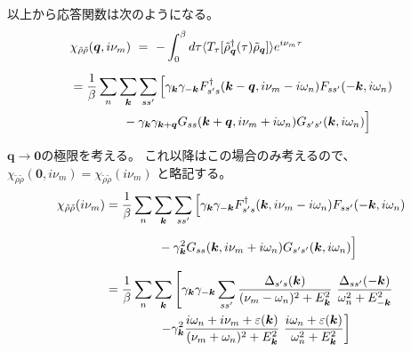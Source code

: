 \documentclass[a4j]{jsarticle}
\begin{document}
以上から応答関数は次のようになる。
\begin{align}
	 &
	\chi_{\tilde{\rho} \tilde{\rho}}(\bm{q},i \nu_{m})
	\ = \
	-
	\int^{\beta}_{0} d \tau
	\langle T_{\tau}[ \tilde{\rho}_{\bm{q}}^{\dagger} (\tau) \tilde{\rho}_{\bm{q}} ] \rangle
	e^{i \nu_{m} \tau}
	\nonumber \\[2mm]
	 & =
	\dfrac{1}{\beta}
	\sum_{n}
	\sum_{ \bm{k} }
	\sum_{s s'}
	\Big[
		\gamma_{\bm{k}}
		\gamma_{-\bm{k}}
		F_{ s' s }^{\dagger}( \bm{k} - \bm{q} , i \nu_{m} - i \omega_{n} )
		F_{ s s' } ( - \bm{k} , i \omega_{n} )
	\nonumber \\ & \hspace{15mm} -
		\gamma_{\bm{k}}
		\gamma_{\bm{k}+\bm{q}}
		G_{ s s } ( \bm{k} + \bm{q} , i \nu_{m} + i \omega_{n} )
		G_{ s' s' } ( \bm{k} , i \omega_{n} )
		\Big]
\end{align}

$\bm{q} \to \bm{0}$の極限を考える。
これ以降はこの場合のみ考えるので、
$\chi_{\tilde{\rho} \tilde{\rho}}(\bm{0},i \nu_{m}) = \chi_{\tilde{\rho} \tilde{\rho}}(i \nu_{m})$
と略記する。
\begin{align}
	\chi_{\tilde{\rho} \tilde{\rho}}(i \nu_{m})
	 & =
	\dfrac{1}{\beta}
	\sum_{n}
	\sum_{ \bm{k} }
	\sum_{s s'}
	\Big[
		\gamma_{\bm{k}}
		\gamma_{-\bm{k}}
		F_{ s' s }^{\dagger}( \bm{k} , i \nu_{m} - i \omega_{n} )
		F_{ s s' } ( - \bm{k} , i \omega_{n} )
	\nonumber \\[2mm] & \hspace{15mm} -
	\gamma_{\bm{k}}^{2}
	G_{ s s } ( \bm{k} , i \nu_{m} + i \omega_{n} )
	G_{ s' s' } ( \bm{k} , i \omega_{n} )
	\Big]
	\nonumber \\[2mm]
	 & =
	\dfrac{1}{\beta}
	\sum_{n}
	\sum_{ \bm{k} }
	\left[
		\gamma_{\bm{k}}
		\gamma_{-\bm{k}}
		\sum_{s s'}
		\dfrac{ \Delta_{s' s}(\bm{k}) }{ ( \nu_{m} - \omega_{n} )^{2} + E_{\bm{k}}^{2} }
		\
		\dfrac{ \Delta_{s s'}(-\bm{k}) }{ \omega_{n}^{2} + E_{-\bm{k}}^{2} }
		\right.
	\nonumber \\ & \hspace{15mm} \left.
		-
		\gamma_{\bm{k}}^{2}
		\dfrac{ i \omega_{n} + i \nu_{m} + \varepsilon(\bm{k}) }{ ( \nu_{m} + \omega_{n} )^{2} + E_{\bm{k}}^{2} }
		\
		\dfrac{ i \omega_{n} + \varepsilon(\bm{k}) }{ \omega_{n}^{2} + E_{\bm{k}}^{2} }
		\right]
\end{align}
\end{document}
